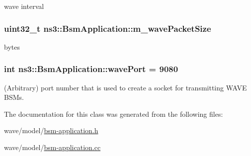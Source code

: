 wave interval 

\subsubsection[{\texorpdfstring{m\+\_\+wave\+Packet\+Size}{m_wavePacketSize}}]{\setlength{\rightskip}{0pt plus 5cm}uint32\+\_\+t ns3\+::\+Bsm\+Application\+::m\+\_\+wave\+Packet\+Size\hspace{0.3cm}{\ttfamily [private]}}\hypertarget{classns3_1_1BsmApplication_a039fd69a7586ab2632da57b666e523bc}{}\label{classns3_1_1BsmApplication_a039fd69a7586ab2632da57b666e523bc}


bytes 

\subsubsection[{\texorpdfstring{wave\+Port}{wavePort}}]{\setlength{\rightskip}{0pt plus 5cm}int ns3\+::\+Bsm\+Application\+::wave\+Port = 9080\hspace{0.3cm}{\ttfamily [static]}}\hypertarget{classns3_1_1BsmApplication_a93a6ddc889084ac867d99cfe94e092d2}{}\label{classns3_1_1BsmApplication_a93a6ddc889084ac867d99cfe94e092d2}
(Arbitrary) port number that is used to create a socket for transmitting W\+A\+VE B\+S\+Ms. 

The documentation for this class was generated from the following files\+:\begin{DoxyCompactItemize}
\item 
wave/model/\hyperlink{bsm-application_8h}{bsm-\/application.\+h}\item 
wave/model/\hyperlink{bsm-application_8cc}{bsm-\/application.\+cc}\end{DoxyCompactItemize}
